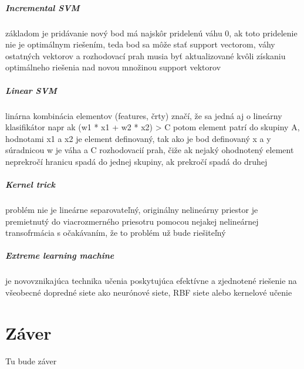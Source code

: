 \documentclass[12pt,oneside,slovak,a4paper]{book}
\begin{document}
\paragraph{Incremental SVM}
základom je pridávanie %
nový bod má najskôr pridelenú váhu 0, ak toto pridelenie nie je optimálnym riešením, teda bod sa môže stať support vectorom,
váhy ostatných vektorov a rozhodovací prah musia byť aktualizované kvôli získaniu optimálneho riešenia nad novou množinou support vektorov

\paragraph{Linear SVM}
linárna kombinácia elementov (features, črty) značí, že sa jedná aj o lineárny klasifikátor  %
napr ak (w1 * x1 + w2 * x2) > C potom element patrí do skupiny A, hodnotami x1 a x2 je element definovaný, tak ako je bod definovaný x a y súradnicou
w je váha a C rozhodovacií prah, čiže ak nejaký ohodnotený element neprekročí hranicu spadá do jednej skupiny, ak prekročí spadá do druhej

\paragraph{Kernel trick}
problém nie je lineárne separovateľný, originálny nelineárny priestor %
je premietnutý do viacrozmerného priesotru pomocou nejakej nelineárnej transofrmácia s očakávaním, že to problém už bude riešiteľný

\paragraph{Extreme learning machine}
je novovznikajúca technika učenia poskytujúca efektívne %
a zjednotené riešenie na všeobecné dopredné siete ako
neurónové siete, RBF siete alebo kernelové učenie


\chapter{Záver} \label{zaver}
Tu bude záver




\end{document}
